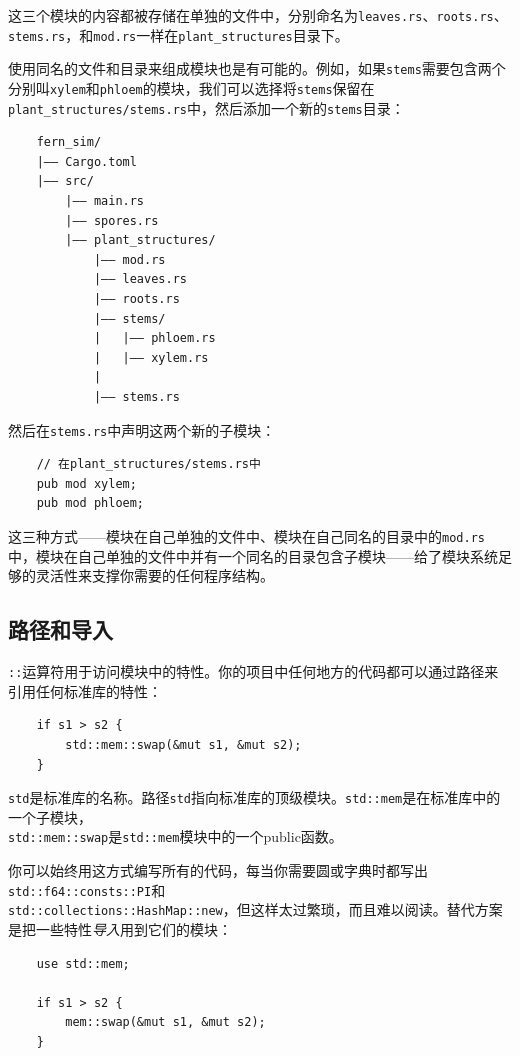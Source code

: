 这三个模块的内容都被存储在单独的文件中，分别命名为\texttt{leaves.rs}、\texttt{roots.rs}、\texttt{stems.rs}，和\texttt{mod.rs}一样在\texttt{plant\_structures}目录下。

使用同名的文件和目录来组成模块也是有可能的。例如，如果\texttt{stems}需要包含两个分别叫\texttt{xylem}和\texttt{phloem}的模块，我们可以选择将\texttt{stems}保留在\texttt{plant\_structures/stems.rs}中，然后添加一个新的\texttt{stems}目录：
\begin{verbatim}
    fern_sim/
    |—— Cargo.toml
    |—— src/
        |—— main.rs
        |—— spores.rs
        |—— plant_structures/
            |—— mod.rs
            |—— leaves.rs
            |—— roots.rs
            |—— stems/
            |   |—— phloem.rs
            |   |—— xylem.rs
            |
            |—— stems.rs
\end{verbatim}

然后在\texttt{stems.rs}中声明这两个新的子模块：
\begin{verbatim}
    // 在plant_structures/stems.rs中
    pub mod xylem;
    pub mod phloem;
\end{verbatim}

这三种方式——模块在自己单独的文件中、模块在自己同名的目录中的\texttt{mod.rs}中，模块在自己单独的文件中并有一个同名的目录包含子模块——给了模块系统足够的灵活性来支撑你需要的任何程序结构。

\subsection{路径和导入}
\texttt{::}运算符用于访问模块中的特性。你的项目中任何地方的代码都可以通过路径来引用任何标准库的特性：
\begin{verbatim}
    if s1 > s2 {
        std::mem::swap(&mut s1, &mut s2);
    }
\end{verbatim}

\texttt{std}是标准库的名称。路径\texttt{std}指向标准库的顶级模块。\texttt{std::mem}是在标准库中的一个子模块，\\
\texttt{std::mem::swap}是\texttt{std::mem}模块中的一个public函数。

你可以始终用这方式编写所有的代码，每当你需要圆或字典时都写出\texttt{std::f64::consts::PI}和\\
\texttt{std::collections::HashMap::new}，但这样太过繁琐，而且难以阅读。替代方案是把一些特性\emph{导入}用到它们的模块：
\begin{verbatim}
    use std::mem;

    if s1 > s2 {
        mem::swap(&mut s1, &mut s2);
    }
\end{verbatim}

